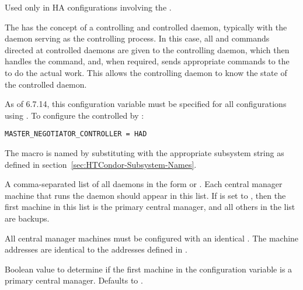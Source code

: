 \begin{description}
\label{param:MasterSubsysController}
\item[\Macro{MASTER\_<SUBSYS>\_CONTROLLER}]
  Used only in HA configurations involving the .

  The  has the concept of a controlling and controlled
  daemon, typically
  with the  daemon serving as the controlling process.
  In this case, all  and  commands directed
  at controlled daemons are given to the controlling daemon, which
  then handles the command, and, when required, sends appropriate
  commands to the  to do the actual work.  This allows
  the controlling daemon to know the state of the controlled daemon.

  As of 6.7.14, this configuration variable must be specified for all
  configurations using .
  To configure the  controlled by :

\begin{verbatim}
MASTER_NEGOTIATOR_CONTROLLER = HAD
\end{verbatim}

  The macro is named by substituting 
  with the appropriate subsystem string as defined in
  section~\ref{sec:HTCondor-Subsystem-Names}.


\label{param:HADList}
\item[\Macro{HAD\_LIST}]
  A comma-separated list of all  daemons
  in the form  or .
  Each central manager machine that runs the  daemon
  should appear in this list.
  If  is set to ,
  then the first machine in this list is the primary central
  manager, and all others in the list are backups.

  All central manager machines must be configured with 
  an identical .
  The machine addresses are identical to the addresses defined
  in .

%
%
%
%

\label{param:HADUsePrimary}
\item[\Macro{HAD\_USE\_PRIMARY}]
  Boolean value to determine if the first machine in the 
   configuration variable is
  a primary central manager.
  Defaults to .


\end{description}
